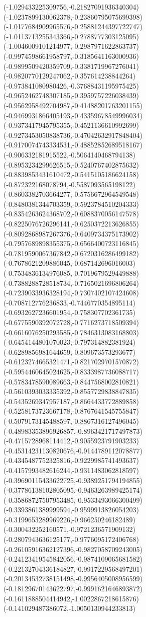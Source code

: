 {(-1.029433225309756,-0.21827091936340304)
(-1.0237899130062378,-0.23860795075699398)
(-1.0177684909965576,-0.25881244397722747)
(-1.0113713255343366,-0.2788777303125095)
(-1.0046009101214977,-0.2987971622863737)
(-0.9974598661958797,-0.3185641163000936)
(-0.9899509420359709,-0.3381719967276041)
(-0.9820770129247062,-0.357614238844264)
(-0.973841080980426,-0.37688431195975425)
(-0.9652462748307185,-0.3959757226038439)
(-0.9562958492704987,-0.41488201763201155)
(-0.9469931866405193,-0.43359678549996034)
(-0.9373417945795355,-0.4521136610992699)
(-0.9273453050838736,-0.47042632917848404)
(-0.9170074743334531,-0.48852852689518167)
(-0.906332181915522,-0.5064140468794138)
(-0.8953234299626515,-0.5240767402875632)
(-0.8839853431610472,-0.5415105186624158)
(-0.872322168078794,-0.5587093565198122)
(-0.8603382703664277,-0.5756672964549548)
(-0.8480381344703359,-0.5923784510204333)
(-0.8354263624368702,-0.6088370056147578)
(-0.8225076726296141,-0.6250372213626855)
(-0.8092868987267376,-0.6409734375173902)
(-0.7957689898355375,-0.6566400723116845)
(-0.7819590067367842,-0.6720316286499182)
(-0.7678621209886045,-0.687142696016003)
(-0.7534836134976085,-0.7019679529449888)
(-0.7388288728518734,-0.7165021696806264)
(-0.7239033936328194,-0.7307402107424608)
(-0.708712776236833,-0.7446770354895114)
(-0.6932627236601954,-0.758307702361735)
(-0.6775590392072728,-0.7716273718509394)
(-0.6616076250293585,-0.7846313083168803)
(-0.6454144801070023,-0.797314882381924)
(-0.6289856981644659,-0.809673573293677)
(-0.6123274665321471,-0.8217029701570872)
(-0.5954460645024625,-0.8333987736088717)
(-0.5783478590089663,-0.8447568002810821)
(-0.5610393033335392,-0.8557729838847835)
(-0.5435269347957187,-0.8664433772889858)
(-0.5258173723667178,-0.8767641545755847)
(-0.5079173145488597,-0.8867316127496045)
(-0.48983353896926857,-0.8963421717497873)
(-0.4715728968114412,-0.9055923791903233)
(-0.45314231130820676,-0.9144789112078877)
(-0.4345487752325816,-0.9229985741493637)
(-0.4157993482616244,-0.9311483062818597)
(-0.39690115433622725,-0.9389251794194855)
(-0.37786138102805095,-0.9463263989425174)
(-0.35868727507953485,-0.9533493066300499)
(-0.3393861389999594,-0.9599913826054203)
(-0.3199653289969226,-0.966250246182489)
(-0.300432252160571,-0.9721236571909132)
(-0.2807943636125177,-0.9776095172406768)
(-0.26105916362127396,-0.9827058709243005)
(-0.24123419545842056,-0.9874109065681582)
(-0.22132704336184827,-0.9917229568497201)
(-0.20134532738151498,-0.9956405008956599)
(-0.18129670143622797,-0.9991621646893872)
(-0.1611888504414942,-1.0022867218615876)
(-0.141029487386072,-1.0050130944233813)
}
